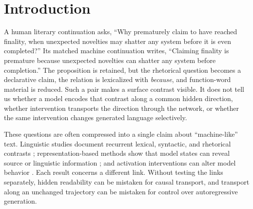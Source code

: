 \section{Introduction}

A human literary continuation asks, ``Why prematurely claim to have reached finality, when unexpected novelties may shatter any system before it is even completed?'' Its matched machine continuation writes, ``Claiming finality is premature because unexpected novelties can shatter any system before completion.'' The proposition is retained, but the rhetorical question becomes a declarative claim, the relation is lexicalized with \emph{because}, and function-word material is reduced. Such a pair makes a surface contrast visible. It does not tell us whether a model encodes that contrast along a common hidden direction, whether intervention transports the direction through the network, or whether the same intervention changes generated language selectively.

These questions are often compressed into a single claim about ``machine-like'' text. Linguistic studies document recurrent lexical, syntactic, and rhetorical contrasts \citep{zamaraeva2025comparing,zanotto2025profiling,reinhart2025variation}; representation-based methods show that model states can reveal source or linguistic information \citep{hewitt2019probe}; and activation interventions can alter model behavior \citep{rimsky2024caa}. Each result concerns a different link. Without testing the links separately, hidden readability can be mistaken for causal transport, and transport along an unchanged trajectory can be mistaken for control over autoregressive generation.

